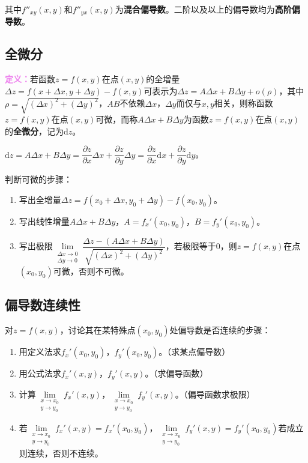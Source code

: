 其中$f''_{xy}(x,y)$和$f''_{yx}(x,y)$为\textbf{混合偏导数}。二阶以及以上的偏导数均为\textbf{高阶偏导数}。

\subsection{全微分}

\textcolor{violet}{\textbf{定义：}}若函数$z=f(x,y)$在点$(x,y)$的全增量$\Delta z=f(x+\Delta x,y+\Delta y)-f(x,y)$可表示为$\Delta z=A\Delta x+B\Delta y+o(\rho)$，其中$\rho=\sqrt{(\Delta x)^2+(\Delta y)^2}$，$AB$不依赖$\Delta x$，$\Delta y$而仅与$x,y$相关，则称函数$z=f(x,y)$在点$(x,y)$可微，而称$A\Delta x+B\Delta y$为函数$z=f(x,y)$在点$(x,y)$的\textbf{全微分}，记为$\textrm{d}z$。

$\textrm{d}z=A\Delta x+B\Delta y=\dfrac{\partial z}{\partial x}\Delta x+\dfrac{\partial z}{\partial y}\Delta y=\dfrac{\partial z}{\partial x}\textrm{d}x+\dfrac{\partial z}{\partial y}\textrm{d}y$。

判断可微的步骤：

\begin{enumerate}
    \item 写出全增量$\Delta z=f(x_0+\Delta x,y_0+\Delta y)-f(x_0,y_0)$。
    \item 写出线性增量$A\Delta x+B\Delta y$，$A=f_x'(x_0,y_0)$，$B=f_y'(x_0,y_0)$。
    \item 写出极限$\lim\limits_{\substack{\Delta x\to0\\\Delta y\to0}}\dfrac{\Delta z-(A\Delta x+B\Delta y)}{\sqrt{(\Delta x)^2+(\Delta y)^2}}$，若极限等于0，则$z=f(x,y)$在点$(x_0,y_0)$可微，否则不可微。
\end{enumerate}

\subsection{偏导数连续性}

对$z=f(x,y)$，讨论其在某特殊点$(x_0,y_0)$处偏导数是否连续的步骤：

\begin{enumerate}
    \item 用定义法求$f_x'(x_0,y_0)$，$f_y'(x_0,y_0)$。（求某点偏导数）
    \item 用公式法求$f_x'(x,y)$，$f_y'(x,y)$。（求偏导函数）
    \item 计算$\lim\limits_{\substack{x\to x_0\\y\to y_0}}f_x'(x,y)$，$\lim\limits_{\substack{x\to x_0\\y\to y_0}}f_y'(x,y)$。（偏导函数求极限）
    \item 若$\lim\limits_{\substack{x\to x_0\\y\to y_0}}f_x'(x,y)=f_x'(x_0,y_0)$，$\lim\limits_{\substack{x\to x_0\\y\to y_0}}f_y'(x,y)=f_y'(x_0,y_0)$若成立则连续，否则不连续。
\end{enumerate}

